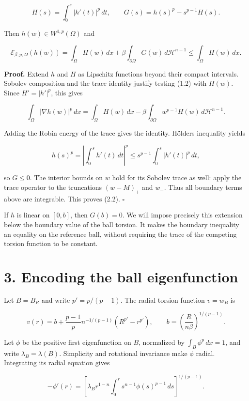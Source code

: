 \documentclass[11pt]{article}
\begin{document}
\[H(s)=\int_0^s|h'(t)|^p\,dt,
\qquad G(s)=h(s)^p-s^{p-1}H(s).\tag{2.1}\]

Then \(h(w)\in W^{1,p}(\Omega)\) and

\[\mathcal E_{\beta,p,\Omega}(h(w))
=\int_\Omega H(w)\,dx+\beta\int_{\partial\Omega}G(w)\,d\mathcal H^{n-1}
\leq\int_\Omega H(w)\,dx.\tag{2.2}\]

\textbf{Proof.} Extend \(h\) and \(H\) as Lipschitz functions beyond
their compact intervals. Sobolev composition and the trace identity
justify testing (1.2) with \(H(w)\). Since \(H'=|h'|^p\), this gives

\[\int_\Omega|\nabla h(w)|^p\,dx
=\int_\Omega H(w)\,dx-\beta\int_{\partial\Omega}w^{p-1}H(w)\,d\mathcal H^{n-1}.\]

Adding the Robin energy of the trace gives the identity.
Hölder\textquotesingle s inequality yields

\[h(s)^p=\left|\int_0^s h'(t)\,dt\right|^p
\leq s^{p-1}\int_0^s|h'(t)|^p\,dt,\]

so \(G\leq0\). The interior bounds on \(w\) hold for its Sobolev trace
as well: apply the trace operator to the truncations \((w-M)_+\) and
\(w_-\). Thus all boundary terms above are integrable. This proves
(2.2). \(\square\)

If \(h\) is linear on \([0,b]\), then \(G(b)=0\). We will impose
precisely this extension below the boundary value of the ball torsion.
It makes the boundary inequality an equality on the reference ball,
without requiring the trace of the competing torsion function to be
constant.

\section{3. Encoding the ball
eigenfunction}\label{encoding-the-ball-eigenfunction}

Let \(B=B_R\) and write \(p'=p/(p-1)\). The radial torsion function
\(v=w_B\) is

\[v(r)=b+\frac{p-1}{p}n^{-1/(p-1)}(R^{p'}-r^{p'}),
\qquad b=\left(\frac R{n\beta}\right)^{1/(p-1)}.\tag{3.1}\]

Let \(\phi\) be the positive first eigenfunction on \(B\), normalized by
\(\int_B\phi^p\,dx=1\), and write \(\lambda_B=\lambda(B)\). Simplicity
and rotational invariance make \(\phi\) radial. Integrating its radial
equation gives

\[-\phi'(r)=\left[\lambda_B r^{1-n}\int_0^r s^{n-1}\phi(s)^{p-1}\,ds\right]^{1/(p-1)}.\tag{3.2}\]
\end{document}
